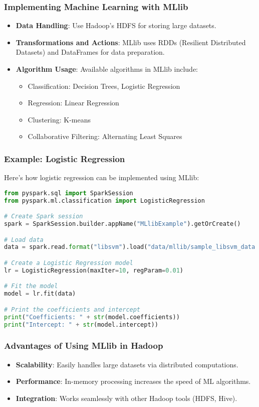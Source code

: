 \documentclass[aspectratio=169]{beamer}
\begin{document}
\begin{frame}[fragile]
    \frametitle{Implementing Machine Learning with MLlib}
    \begin{itemize}
        \item \textbf{Data Handling}: Use Hadoop's HDFS for storing large datasets.
        \item \textbf{Transformations and Actions}: MLlib uses RDDs (Resilient Distributed Datasets) and DataFrames for data preparation.
        \item \textbf{Algorithm Usage}: Available algorithms in MLlib include:
            \begin{itemize}
                \item Classification: Decision Trees, Logistic Regression
                \item Regression: Linear Regression
                \item Clustering: K-means
                \item Collaborative Filtering: Alternating Least Squares
            \end{itemize}
    \end{itemize}
\end{frame}

\begin{frame}[fragile]
    \frametitle{Example: Logistic Regression}
    Here's how logistic regression can be implemented using MLlib:
    \begin{lstlisting}[language=Python]
from pyspark.sql import SparkSession
from pyspark.ml.classification import LogisticRegression

# Create Spark session
spark = SparkSession.builder.appName("MLlibExample").getOrCreate()

# Load data
data = spark.read.format("libsvm").load("data/mllib/sample_libsvm_data.txt")

# Create a Logistic Regression model
lr = LogisticRegression(maxIter=10, regParam=0.01)

# Fit the model
model = lr.fit(data)

# Print the coefficients and intercept
print("Coefficients: " + str(model.coefficients))
print("Intercept: " + str(model.intercept))
    \end{lstlisting}
\end{frame}

\begin{frame}[fragile]
    \frametitle{Advantages of Using MLlib in Hadoop}
    \begin{itemize}
        \item \textbf{Scalability}: Easily handles large datasets via distributed computations.
        \item \textbf{Performance}: In-memory processing increases the speed of ML algorithms.
        \item \textbf{Integration}: Works seamlessly with other Hadoop tools (HDFS, Hive).
    \end{itemize}
\end{frame}
\end{document}
